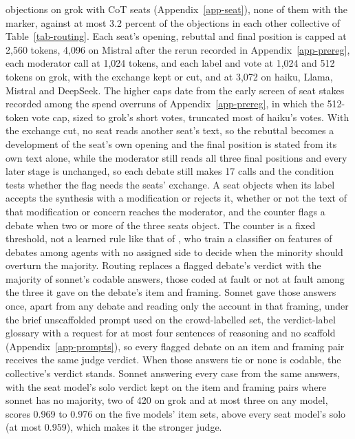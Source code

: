 objections on grok with CoT seats (Appendix~\ref{app-seat}), none of them
with the marker, against at most 3.2 percent of the objections in each other
collective of Table~\ref{tab-routing}.
Each seat's opening, rebuttal and final position is capped at 2,560 tokens,
4,096 on Mistral after the rerun recorded in Appendix~\ref{app-prereg}, each
moderator call at 1,024 tokens, and each label and vote at 1,024 and 512
tokens on grok, with the exchange kept or cut, and at 3,072 on haiku, Llama,
Mistral and DeepSeek. The higher caps date from the early screen of seat
stakes recorded among the spend overruns of Appendix~\ref{app-prereg}, in
which the 512-token vote cap, sized to grok's short votes, truncated most of
haiku's votes.
With the exchange cut, no seat reads another seat's
text, so the rebuttal becomes a development of the seat's own opening and the
final position is stated from its own text alone, while the moderator still
reads all three final positions and every later stage is unchanged, so each
debate still makes 17 calls and the condition tests whether the flag needs
the seats' exchange.
A seat objects when its label accepts the synthesis with a modification or
rejects it, whether or not the text of that modification or concern reaches
the moderator,
and the counter flags a debate when two or more of the three seats object.
The counter is a fixed threshold, not a learned rule like that of
\citet{he2026minoritysentinel}, who train a classifier on features of
debates among agents with no assigned side to decide when the minority
should overturn the majority.
Routing replaces a flagged debate's verdict with the majority of sonnet's
codable answers, those coded at fault or not at fault among the three it
gave on the debate's item and framing. Sonnet gave those answers once, apart
from any debate and reading only the account in that framing, under the
brief unscaffolded prompt used on the crowd-labelled set, the verdict-label
glossary with a request for at most four sentences of reasoning and no
scaffold (Appendix~\ref{app-prompts}), so every flagged debate on an item
and framing pair receives the same judge verdict. When those answers tie or
none is codable, the collective's verdict stands. Sonnet
answering every case from the same answers, with the seat model's solo
verdict kept on the item and framing pairs where sonnet has no majority, two
of 420 on grok and at most three on
any model, scores 0.969 to 0.976 on the five models' item sets,
above every seat model's solo (at most 0.959), which makes it the stronger
judge.

